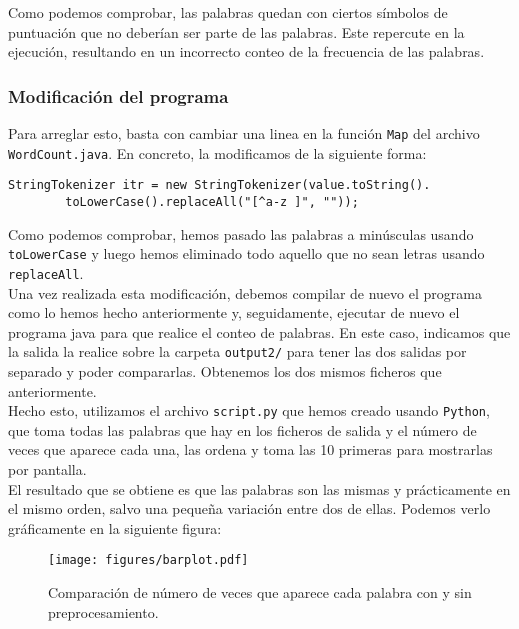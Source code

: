 \documentclass[11pt]{article}
\def\inline{\lstinline[basicstyle=\ttfamily,keywordstyle={}]}
\begin{document}
Como podemos comprobar, las palabras quedan con ciertos símbolos de puntuación que no deberían ser parte de las palabras. Este repercute en la ejecución, resultando en un incorrecto conteo de la frecuencia de las palabras. 

\subsubsection*{ Modificación del programa }

Para arreglar esto, basta con cambiar una linea en la función \inline{Map} del archivo \inline{WordCount.java}. En concreto, la modificamos de la siguiente forma:

\begin{verbatim}
StringTokenizer itr = new StringTokenizer(value.toString().
        toLowerCase().replaceAll("[^a-z ]", ""));
\end{verbatim}

Como podemos comprobar, hemos pasado las palabras a minúsculas usando \inline{toLowerCase} y luego hemos eliminado todo aquello que no sean letras usando \inline{replaceAll}.\\

Una vez realizada esta modificación, debemos compilar de nuevo el programa como lo hemos hecho anteriormente y, seguidamente, ejecutar de nuevo el programa java para que realice el conteo de palabras. En este caso, indicamos que la salida la realice sobre la carpeta \inline{output2/} para tener las dos salidas por separado y poder compararlas. Obtenemos los dos mismos ficheros que anteriormente.\\

Hecho esto, utilizamos el archivo \inline{script.py} que hemos creado usando \inline{Python}, que toma todas las palabras que hay en los ficheros de salida y el número de veces que aparece cada una, las ordena y toma las 10 primeras para mostrarlas por pantalla.\\

El resultado que se obtiene es que las palabras son las mismas y prácticamente en el mismo orden, salvo una pequeña variación entre dos de ellas. Podemos verlo gráficamente en la siguiente figura:

\begin{figure}[H]
	\centering
	\texttt{[image: figures/barplot.pdf]}
	\caption{Comparación de número de veces que aparece cada palabra con y sin preprocesamiento.}
\end{figure}
\end{document}
